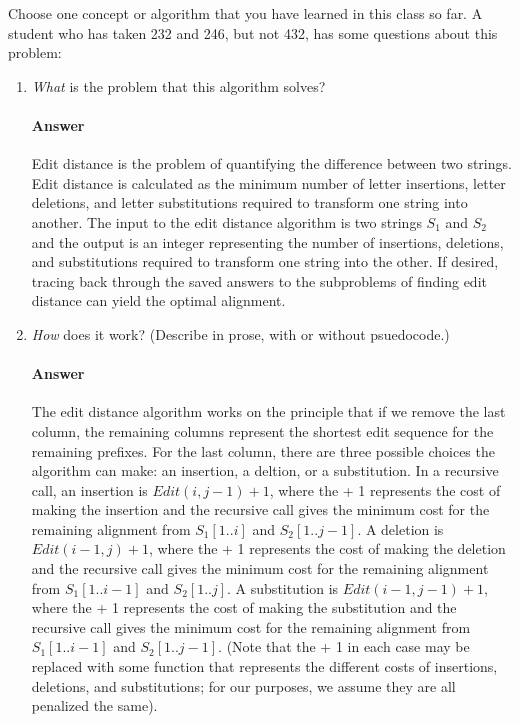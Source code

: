 \documentclass{article}
\begin{document}

Choose one concept or algorithm that you have learned
in this class so far. A student who has
taken 232 and 246, but not 432, has some questions about this problem:

\begin{enumerate}
    \item \emph{What} is the problem that this algorithm solves?

        \paragraph{Answer}
        Edit distance is the problem of quantifying the difference between two strings. Edit distance is calculated as the minimum number of letter insertions, letter deletions, and letter substitutions required to transform one string into another. The input to the edit distance algorithm is two strings $S_1$ and $S_2$ and the output is an integer representing the number of insertions, deletions, and substitutions required to transform one string into the other. If desired, tracing back through the saved answers to the subproblems of finding edit distance can yield the optimal alignment.

    \item \emph{How} does it work? (Describe in prose, with or without
        psuedocode.)

        \paragraph{Answer}        
The edit distance algorithm works on the principle that if we remove the last column, the remaining columns represent the shortest edit sequence for the remaining prefixes. For the last column, there are three possible choices the algorithm can make: an insertion, a deltion, or a substitution. In a recursive call, an insertion is $Edit(i, j-1) + 1$, where the + 1 represents the cost of making the insertion and the recursive call gives the minimum cost for the remaining alignment from $S_1[1..i]$ and $S_2[1..j-1]$. A deletion is $Edit(i - 1, j) + 1$, where the + 1 represents the cost of making the deletion and the recursive call gives the minimum cost for the remaining alignment from $S_1[1..i - 1]$ and $S_2[1..j]$. A substitution is $Edit(i - 1, j - 1) + 1$, where the + 1 represents the cost of making the substitution and the recursive call gives the minimum cost for the remaining alignment from $S_1[1..i - 1]$ and $S_2[1..j-1]$. (Note that the + 1 in each case may be replaced with some function that represents the different costs of insertions, deletions, and substitutions; for our purposes, we assume they are all penalized the same).


\end{enumerate}
\end{document}

